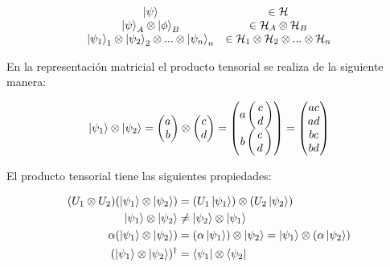 \begin{equation}
    \begin{array}{c c}
        \ket{\psi} & \in \mathcal{H} \\
        \ket{\psi}_A \otimes \ket{\phi}_B & \in \mathcal{H}_A \otimes \mathcal{H}_B \\
        \ket{\psi_1}_1 \otimes \ket{\psi_2}_2 \otimes ... \otimes \ket{\psi_n}_n & \in \mathcal{H}_1 \otimes \mathcal{H}_2 \otimes ... \otimes \mathcal{H}_n
    \end{array}
\end{equation}

En la representación matricial el producto tensorial se realiza de la siguiente manera:

\begin{equation*}
    \ket{\psi_1} \otimes \ket{\psi_2} =
    \begin{pmatrix}
        a \\
        b
    \end{pmatrix}
    \otimes
    \begin{pmatrix}
        c \\
        d
    \end{pmatrix}
    =
    \left(\!\!\!\begin{array}{c}
            a \left(\!\!\begin{array}{c}
                    c \\
                    d \\
            \end{array}\!\!\right) \\
            b \left(\!\!\begin{array}{c}
                    c \\
                    d \\
            \end{array}\!\!\right)
    \end{array}\!\!\!\right)
    =
    \begin{pmatrix}
        a c \\
        a d \\
        b c \\
        b d \\
    \end{pmatrix}
\end{equation*}

El producto tensorial tiene las siguientes propiedades:

\begin{align}
    (U_1 \otimes U_2) (\ket{\psi_1} \otimes \ket{\psi_2}) &= (U_1 \ket{\psi_1}) \otimes (U_2 \ket{\psi_2}) \\
    \ket{\psi_1} \otimes \ket{\psi_2} &\neq \ket{\psi_2} \otimes \ket{\psi_1} \\
    \alpha (\ket{\psi_1} \otimes \ket{\psi_2}) &= (\alpha \ket{\psi_1}) \otimes \ket{\psi_2} = \ket{\psi_1} \otimes (\alpha \ket{\psi_2}) \\
    (\ket{\psi_1} \otimes \ket{\psi_2})^\dagger &= \bra{\psi_1} \otimes \bra{\psi_2}
\end{align}

